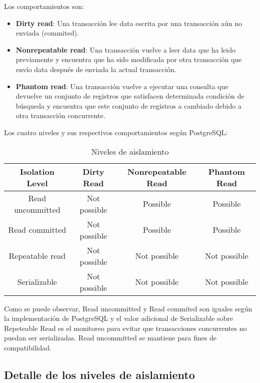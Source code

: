 Los comportamientos son:

\begin{itemize}
\item \textbf{Dirty read}: Una transacción lee data escrita por una transacción aún no enviada (commited).
\item \textbf{Nonrepeatable read}: Una transacción vuelve a leer data que ha leido previamente y encuentra que ha sido modificada por otra transacción que envío data después de enviada la actual transacción.
\item \textbf{Phantom read}: Una transacción vuelve a ejecutar una consulta que devuelve un conjunto de registros que satisfacen determinada condición de búsqueda y encuentra que este conjunto de registros a cambiado debido a otra transacción concurrente.
\end{itemize}

Los cuatro niveles y sus respectivos comportamientos según PostgreSQL:\\

\begin{table}[h]
\centering
\begin{tabular}{|c|c|c|c|} \hline
Isolation Level & Dirty Read   & Nonrepeatable Read & Phantom Read \\ \hline
Read uncommitted & Not possible & Possible           & Possible     \\ \hline
Read committed   & Not possible & Possible           & Possible     \\ \hline
Repeatable read  & Not possible & Not possible       & Not possible \\ \hline
Serializable     & Not possible & Not possible       & Not possible \\ \hline
\end{tabular}
\caption{Niveles de aislamiento}
\end{table}

Como se puede observar, Read uncommitted y Read commited son iguales según la implementación de PostgreSQL y el valor adicional de Serializable sobre Repeteable Read es el monitoreo para evitar que transacciones concurrentes no puedan ser serializadas. Read uncommitted se mantiene para fines de compatibilidad.\\

\subsection{Detalle de los niveles de aislamiento}

